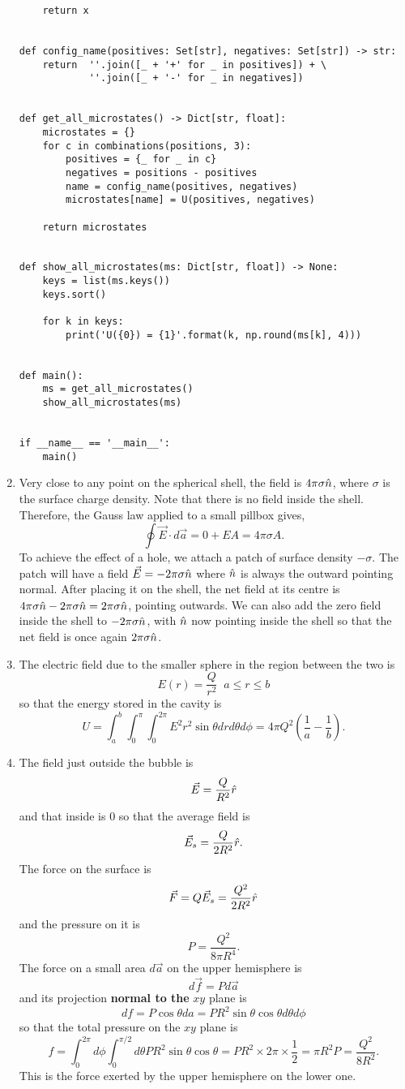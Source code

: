 \documentclass{article}
\begin{document}
\begin{enumerate}
\begin{verbatim}
    return x


def config_name(positives: Set[str], negatives: Set[str]) -> str:
    return  ''.join([_ + '+' for _ in positives]) + \
            ''.join([_ + '-' for _ in negatives])


def get_all_microstates() -> Dict[str, float]:
    microstates = {}
    for c in combinations(positions, 3):
        positives = {_ for _ in c}
        negatives = positions - positives    
        name = config_name(positives, negatives)
        microstates[name] = U(positives, negatives)

    return microstates


def show_all_microstates(ms: Dict[str, float]) -> None:
    keys = list(ms.keys())
    keys.sort()

    for k in keys:
        print('U({0}) = {1}'.format(k, np.round(ms[k], 4)))


def main():
    ms = get_all_microstates()
    show_all_microstates(ms)


if __name__ == '__main__':
    main()    
\end{verbatim}

\item Very close to any point on the spherical shell, the field is $4\pi\sigma\hat{n}$,
where $\sigma$ is the surface charge density. Note that there is no field inside
the shell. Therefore, the Gauss law applied to a small pillbox gives,
\[
\oint\vec{E}\cdot d\vec{a} = 0 + EA = 4\pi\sigma A.
\]
To achieve the effect of a hole, we attach a patch of surface density $-\sigma$.
The patch will have a field $\vec{E} = -2\pi\sigma\hat{n}$ where $\hat{n}$ is always the
outward pointing normal. After placing it on the shell, the net field at its 
centre is $4\pi\sigma\hat{n} - 2\pi\sigma\hat{n} = 2\pi\sigma\hat{n}$, pointing outwards.
We can also add the zero field inside the shell to $-2\pi\sigma\hat{n}$, with $\hat{n}$
now pointing inside the shell so that the net field is once again $2\pi\sigma\hat{n}$.

\item The electric field due to the smaller sphere in the region between the
two is
\[
E(r) = \frac{Q}{r^2} \;\; a \le r \le b
\]
so that the energy stored in the cavity is
\[
U = \int_a^b\int_0^\pi\int_0^{2\pi} E^2 r^2\sin\theta drd\theta d\phi =
4\pi Q^2\left(\frac{1}{a} - \frac{1}{b}\right).
\]

\item The field just outside the bubble is
\[
\vec{E} = \frac{Q}{R^2}\hat{r}
\]
and that inside is $0$ so that the average field is
\[
\vec{E}_s = \frac{Q}{2R^2}\hat{r}.
\]
The force on the surface is 
\[
\vec{F} = Q\vec{E}_s = \frac{Q^2}{2R^2}\hat{r}
\]
and the pressure on it is 
\[
P = \frac{Q^2}{8\pi R^4}.
\]
The force on a small area $d\vec{a}$ on the upper hemisphere is 
\[
d\vec{f} = Pd\vec{a}
\]
and its projection \textbf{normal to the} $xy$ plane is 
\[
df = P\cos\theta da = PR^2\sin\theta\cos\theta d\theta d\phi
\]
so that the total pressure on the $xy$ plane is
\[
f = \int_0^{2\pi} d\phi \int_0^{\pi/2} d\theta PR^2\sin\theta\cos\theta =
PR^2 \times 2\pi \times \frac{1}{2} = \pi R^2 P = \frac{Q^2}{8R^2}.
\]
This is the force exerted by the upper hemisphere on the lower one.


\end{enumerate}
\end{document}
